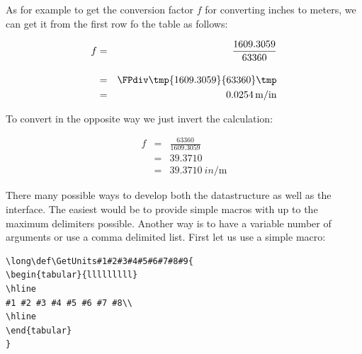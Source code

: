 \documentclass{tufte-book}
\begin{document}
As for example to get the conversion factor $f$ for converting inches to meters, we can get it from the first row fo the table as follows:

\begin{eqnarray}
              f &=&\frac{1609.3059}{63360}\\[10pt] 
              &=& \FPdiv\tmp{1609.3059}{63360}\tmp\\
              &=& \SI{0.0254}{\meter\per in}
\end{eqnarray}

To convert in the opposite way we just invert the calculation:


\begin{eqnarray}
            f &=&\frac{63360}{1609.3059}\\[10pt] 
              &=& 39.3710\\
              &=& \SI{39.3710}{in\per\meter}
\end{eqnarray}

There many possible ways to develop both the datastructure as well as the interface. The easiest would be to provide simple macros with up to the maximum delimiters possible. Another way is to have a variable number of arguments or use a comma delimited list. First let us use a simple macro:


\begin{verbatim}
\long\def\GetUnits#1#2#3#4#5#6#7#8#9{
\begin{tabular}{lllllllll}
\hline
#1 #2 #3 #4 #5 #6 #7 #8\\
\hline
\end{tabular}
}
\end{verbatim}
\end{document}
